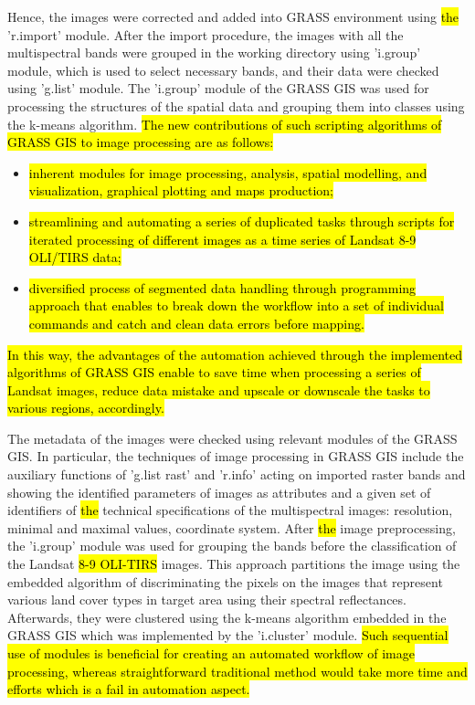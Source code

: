 \documentclass[land,article,submit,pdftex,moreauthors]{Definitions/mdpi}
\begin{document}
Hence, the images were corrected and added into GRASS environment using \hl{the }'r.import' module. After the import procedure, the images with all the multispectral bands were grouped in the working directory using 'i.group' module, which is used to select necessary bands, and their data were checked using 'g.list' module. The 'i.group' module of the GRASS GIS was used for processing the structures of the spatial data and grouping them into classes using the k-means algorithm. \hl{The new contributions of such scripting algorithms of GRASS GIS to image processing are as follows: }
\begin{itemize}
	\item \hl{inherent modules for image processing, analysis, spatial modelling, and visualization, graphical plotting and maps production; }
	\item \hl{streamlining and automating a series of duplicated tasks through scripts for iterated processing of different images as a time series of Landsat 8-9 OLI/TIRS data; }
	\item \hl{diversified process of segmented data handling through programming approach that enables to break down the workflow into a set of individual commands and catch and clean data errors before mapping.}
\end{itemize}
\hl{ In this way, the advantages of the automation achieved through the implemented algorithms of GRASS GIS enable to save time when processing a series of Landsat images, reduce data mistake and upscale or downscale the tasks to various regions, accordingly.}

The metadata of the images were checked using relevant modules of the GRASS GIS. In particular, the techniques of image processing in GRASS GIS include the auxiliary functions of 'g.list rast' and 'r.info' acting on imported raster bands and showing the identified parameters of images as attributes and a given set of identifiers of \hl{the }technical specifications of the multispectral images: resolution, minimal and maximal values, coordinate system. After \hl{the }image preprocessing, the 'i.group' module was used for grouping the bands before the classification of the Landsat \hl{8-9 OLI-TIRS }images. This approach partitions the image using the embedded algorithm of discriminating the pixels on the images that represent various land cover types in target area using their spectral reflectances. Afterwards, they were clustered using the k-means algorithm embedded in the GRASS GIS which was implemented by the 'i.cluster' module. \hl{Such sequential use of modules is beneficial for creating an automated workflow of image processing, whereas straightforward traditional method would take more time and efforts which is a fail in automation aspect. }
\end{document}
